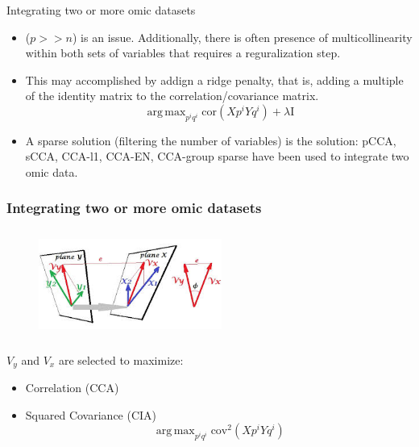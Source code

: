 \documentclass[10pt,xcolor=dvipsnames]{beamer}\usepackage[]{graphicx}\usepackage[]{color}
\DeclareMathOperator{\argmax}{arg\,max}
\begin{document}
\begin{frame}{Integrating two or more omic datasets}

\begin{itemize}
\item ($p >> n$) is an issue. Additionally, there is often presence of multicollinearity within both sets of variables that requires a reguralization step.
\item This may accomplished by addign a ridge penalty, that is, adding a multiple of the identity matrix to the correlation/covariance matrix.
$$ \argmax_{p^i q^i} \text{cor}(Xp^i Yq^i) + \lambda \text{I}$$

\item A sparse solution (filtering the number of variables) is the solution: pCCA, sCCA, CCA-l1, CCA-EN, CCA-group sparse have been used to integrate two omic data.
\end{itemize}
\end{frame}



\begin{frame}\frametitle{Integrating two or more omic datasets}

\begin{figure}
\begin{center}
 \includegraphics[height=3.5cm, width=6cm]{figures/canonical_correlation.jpg}
\end{center}
\end{figure}

$V_y$ and $V_x$ are selected to maximize:

\begin{itemize}
 \item Correlation (CCA)
 \item Squared Covariance (CIA)
       $$ \argmax_{p^i q^i} \text{cov}^2(Xp^i Yq^i)$$
\end{itemize}

\end{frame}
\end{document}
